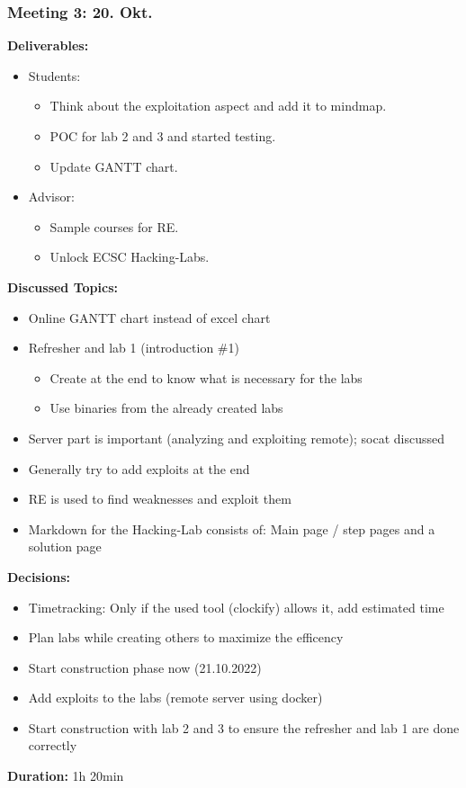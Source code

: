 \subsubsection*{Meeting 3: 20. Okt.}
\textbf{Deliverables:} 
\begin{itemize}
    \item Students:
    \begin{itemize}
        \item Think about the exploitation aspect and add it to mindmap.
        \item POC for lab 2 and 3 and started testing.
        \item Update GANTT chart.
    \end{itemize}
    \item Advisor:
    \begin{itemize}
        \item Sample courses for RE.
        \item Unlock ECSC Hacking-Labs. 
    \end{itemize}
\end{itemize}
\textbf{Discussed Topics:} 
\begin{itemize}
    \item Online GANTT chart instead of excel chart
    \item Refresher and lab 1 (introduction \#1)
    \begin{itemize}
        \item Create at the end to know what is necessary for the labs
        \item Use binaries from the already created labs
    \end{itemize}
    \item Server part is important (analyzing and exploiting remote); socat discussed
    \item Generally try to add exploits at the end
    \item RE is used to find weaknesses and exploit them
    \item Markdown for the Hacking-Lab consists of: Main page / step pages and a solution page
\end{itemize}
\textbf{Decisions:}
\begin{itemize}
    \item Timetracking: Only if the used tool (clockify) allows it, add estimated time
    \item Plan labs while creating others to maximize the efficency
    \item Start construction phase now (21.10.2022)
    \item Add exploits to the labs (remote server using docker)
    \item Start construction with lab 2 and 3 to ensure the refresher and lab 1 are done correctly
\end{itemize}
\textbf{Duration:} 1h 20min

